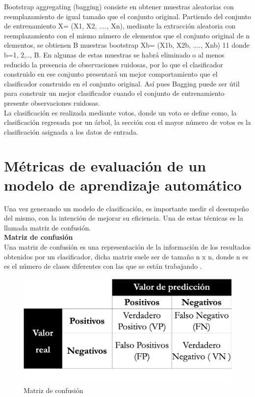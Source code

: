Bootstrap aggregating (bagging) consiste en obtener muestras aleatorias con reemplazamiento de igual tamaño que el conjunto original\citep{CT24}. Partiendo del conjunto de entrenamiento X= (X1, X2, ...., Xn), mediante la extracción aleatoria con reemplazamiento con el mismo número de elementos que el conjunto original de n elementos, se obtienen B muestras bootstrap Xb= (X1b, X2b, ...., Xnb)
11
donde b=1, 2,.., B. En algunas de estas muestras se habrá eliminado o al menos reducido la presencia de observaciones ruidosas, por lo que el clasificador construido en ese conjunto presentará un mejor comportamiento que el clasificador construido en el conjunto original. Así pues Bagging puede ser útil para construir un mejor clasificador cuando el conjunto de entrenamiento presente observaciones ruidosas.\\

La clasificación es realizada mediante votos, donde un voto se define como, la clasificación regresada por un árbol, la sección con el mayor número de votos es la clasificación asignada a los datos de entrada.




\section{Métricas de evaluación de un modelo de aprendizaje automático}


Una vez generando un modelo de clasificación, es importante medir el desempeño del mismo, con
la intención de mejorar su eficiencia. Una de estas técnicas es la llamada matriz de confusión.\\

\textbf{Matriz de confusión}\\

Una matriz de confusión es una representación de la información de los resultados obtenidos por un
clasificador, dicha matriz suele ser de tamaño n x n, donde n es es el número de clases diferentes con
las que se están trabajando \citep{CT23}.

\begin{figure}[H]
	\centering
	\includegraphics[scale=.3]{imagenes/Capitulo3/MatrizC.png}
	\caption{Matriz de confusión}
	\label{Fig:mconfu}
\end{figure}

